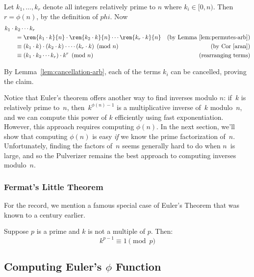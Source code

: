 \begin{editingnotes}
Let $k_1, \dots, k_r$ denote all integers relatively prime to $n$
where $ k_i\in [0, n)$.  Then $r = \phi(n)$, by the definition of
  $phi$.  Now
\begin{align*}
\lefteqn{k_1 \cdot k_2 \cdots k_r} \hspace{0.25in} \\
  & = \rem{k_1 \cdot k}{n} \cdot \rem{k_2 \cdot k}{n} \cdots \rem{k_r \cdot k}{n}
      & \text{(by Lemma~\ref{lem:permutes-arb})}\\
  & \equiv (k_1 \cdot k) \cdot (k_2 \cdot k) \cdot \cdots (k_r \cdot k) \pmod{n}
      & \text{(by Cor~\ref{aran})}\\
  & \equiv (k_1 \cdot k_2 \cdots k_r) \cdot k^r \pmod{n}
      & \text{(rearranging terms)}
\end{align*}

By Lemma~\ref{lem:cancellation-arb}, each of the terms $k_i$ can be cancelled, proving the
claim.
\end{editingnotes}


Notice that Euler's theorem offers another way to find inverses modulo
$n$: if~$k$ is relatively prime to~$n$, then~$k^{\phi(n)-1}$ is a
multiplicative inverse of~$k$ modulo~$n$, and we can compute this
power of $k$ efficiently using fast exponentiation.  However, this
approach requires computing $\phi(n)$.  In the next section, we'll
show that computing $\phi(n)$ is easy \emph{if} we know the prime
factorization of~$n$.  Unfortunately, finding the factors of~$n$ seems
generally hard to do when $n$~is large, and so the Pulverizer remains
the best approach to computing inverses modulo~$n$.

\subsubsection{Fermat's Little Theorem}

For the record, we mention a famous special case of Euler's Theorem
that was known to  a century
earlier.

\begin{corollary}\label{fermat_little}
Suppose $p$ is a prime and $k$ is not a multiple of $p$.  Then:
\[
k^{p-1} \equiv 1 \pmod{p}
\]
\end{corollary}

\subsection{Computing Euler's $\phi$ Function}

